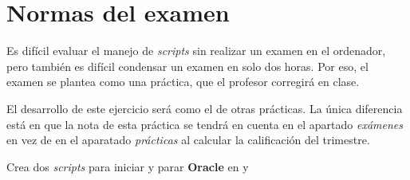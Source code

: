 
\usepackage{eurosym}



\renewcommand{\hmwkTitle}{Examen de \textit{scripts} de \textit{shell}}


\usepackage{blindtext}








\primerapagina

\setlength{\parindent}{0em}
\setlength{\parskip}{1em}

\section{Normas del examen}
Es difícil evaluar el manejo de \textit{scripts} sin realizar un examen en el ordenador, pero también es difícil condensar un examen en solo dos horas. Por eso, el examen se plantea como una práctica, que el profesor corregirá en clase.

El desarrollo de este ejercicio será como el de otras prácticas. La única diferencia está en que la nota de esta práctica se tendrá en cuenta en el apartado \textit{exámenes} en vez de en el aparatado \textit{prácticas} al calcular la calificación del trimestre.


\begin{homeworkProblem}

  Crea dos \textit{scripts} para iniciar y parar \textbf{Oracle} en  y 
  
\end{homeworkProblem}

